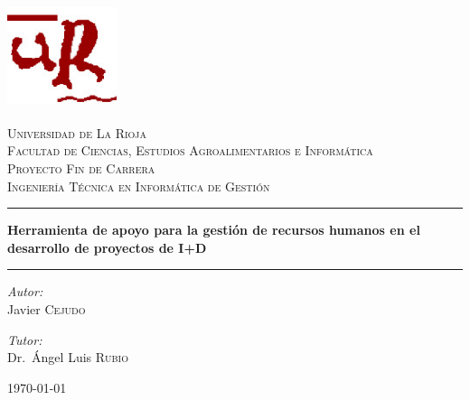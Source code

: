 \begin{titlepage}

\begin{center}

\begin{center}
\includegraphics[height=1.20in,width=1.27in]{imagenes/ur}
\end{center}

\vspace{3mm}

\textsc{\LARGE Universidad de La Rioja}\\[0.5cm]

\textsc{\large Facultad de Ciencias, Estudios Agroalimentarios e
Informática}\\[0.5cm]

\textsc{\Large Proyecto Fin de Carrera}\\[0.5cm]

\textsc{\large Ingeniería Técnica en Informática de Gestión}\\[0.5cm]

\vspace{10mm}\hrule\vspace{5mm}
{ \LARGE \bfseries Herramienta de apoyo para la
gestión de recursos humanos en el desarrollo de proyectos de I+D}
\vspace{5mm}\hrule\vspace{10mm}

\begin{minipage}{0.4\textwidth}
\begin{flushleft} \large
\emph{Autor:}\\
Javier \textsc{Cejudo}
\end{flushleft}
\end{minipage}
\begin{minipage}{0.4\textwidth}
\begin{flushright} \large
\emph{Tutor:} \\
Dr.~Ángel Luis \textsc{Rubio}
\end{flushright}
\end{minipage}

\vfill

{\large \today}

\end{center}

\end{titlepage}